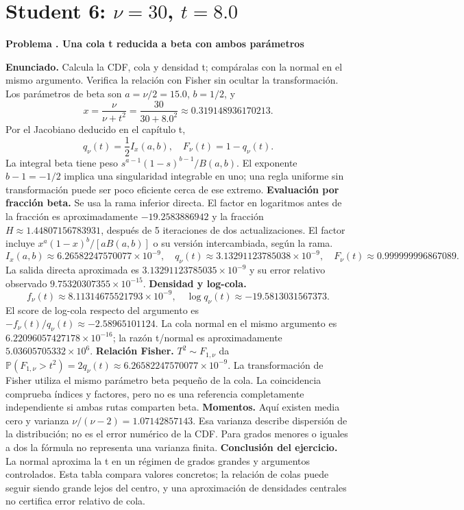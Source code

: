 \documentclass[11pt,a4paper]{article}
\newcommand{\Prob}{\mathbb P}
\theoremstyle{definition}
\newcounter{problema}
\newenvironment{resuelto}[1]{\refstepcounter{problema}\par\medskip\Needspace{6\baselineskip}\textbf{Problema \theproblema. #1}\par}{\par\medskip}
\begin{document}
\section{\texorpdfstring{Student 6: $\nu=30$, $t=8.0$}{Student 6: nu=30, t=8.0}}
\begin{resuelto}{Una cola t reducida a beta con ambos parámetros}
\textbf{Enunciado.} Calcula la CDF, cola y densidad t; compáralas con la normal en el mismo argumento. Verifica la relación con Fisher sin ocultar la transformación.
Los parámetros de beta son $a=\nu/2=15.0$, $b=1/2$, y
\[
x=\frac{\nu}{\nu+t^2}=\frac{30}{30+8.0^2}\approx0.319148936170213.
\]
Por el Jacobiano deducido en el capítulo t,
\[
q_\nu(t)=\frac12 I_x(a,b),\quad F_\nu(t)=1-q_\nu(t).
\]
La integral beta tiene peso $s^{a-1}(1-s)^{b-1}/B(a,b)$. El exponente $b-1=-1/2$ implica una singularidad integrable en uno; una regla uniforme sin transformación puede ser poco eficiente cerca de ese extremo.
\textbf{Evaluación por fracción beta.} Se usa la rama inferior directa. El factor en logaritmos antes de la fracción es aproximadamente $-19.2583886942$ y la fracción $H\approx1.44807156783931$, después de 5 iteraciones de dos actualizaciones. El factor incluye $x^a(1-x)^b/[aB(a,b)]$ o su versión intercambiada, según la rama.
\[
I_x(a,b)\approx6.26582247570077\times10^{-9},\quad q_\nu(t)\approx3.13291123785038\times10^{-9},\quad F_\nu(t)\approx0.999999996867089.
\]
La salida directa aproximada es $3.13291123785035\times10^{-9}$ y su error relativo observado $9.75320307355\times10^{-15}$.
\textbf{Densidad y log-cola.}
\[
f_\nu(t)\approx8.11314675521793\times10^{-9},\quad
\log q_\nu(t)\approx-19.5813031567373.
\]
El score de log-cola respecto del argumento es $-f_\nu(t)/q_\nu(t)\approx-2.58965101124$. La cola normal en el mismo argumento es $6.22096057427178\times10^{-16}$; la razón t/normal es aproximadamente $5.03605705332\times10^{6}$.
\textbf{Relación Fisher.} $T^2\sim F_{1,\nu}$ da $\Prob(F_{1,\nu}>t^2)=2q_\nu(t)\approx6.26582247570077\times10^{-9}$. La transformación de Fisher utiliza el mismo parámetro beta pequeño de la cola. La coincidencia comprueba índices y factores, pero no es una referencia completamente independiente si ambas rutas comparten beta.
\textbf{Momentos.} Aquí existen media cero y varianza $\nu/(\nu-2)=1.07142857143$. Esa varianza describe dispersión de la distribución; no es el error numérico de la CDF. Para grados menores o iguales a dos la fórmula no representa una varianza finita.
\textbf{Conclusión del ejercicio.} La normal aproxima la t en un régimen de grados grandes y argumentos controlados. Esta tabla compara valores concretos; la relación de colas puede seguir siendo grande lejos del centro, y una aproximación de densidades centrales no certifica error relativo de cola.
\end{resuelto}
\end{document}
